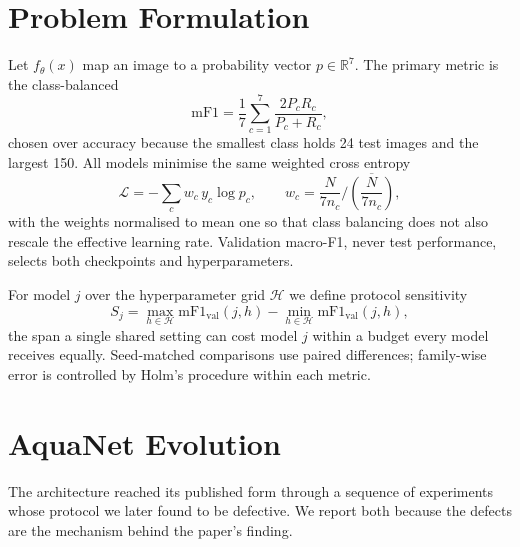 \documentclass[10pt,journal]{IEEEtran}
\newcommand{\mf}{macro-F1}
\begin{document}
\section{Problem Formulation}
Let $f_\theta(x)$ map an image to a probability vector $p \in \mathbb{R}^7$. The primary
metric is the class-balanced
\begin{equation}
\mathrm{mF1}=\frac{1}{7}\sum_{c=1}^{7}\frac{2P_cR_c}{P_c+R_c},
\end{equation}
chosen over accuracy because the smallest class holds 24 test images and the largest 150.
All models minimise the same weighted cross entropy
\begin{equation}
\mathcal{L}=-\sum_{c} w_c\, y_c \log p_c , \qquad
w_c = \frac{N}{7 n_c} \Big/ \overline{\left(\frac{N}{7 n_c}\right)},
\end{equation}
with the weights normalised to mean one so that class balancing does not also rescale the
effective learning rate. Validation \mf{}, never test performance, selects both checkpoints
and hyperparameters.

For model $j$ over the hyperparameter grid $\mathcal{H}$ we define protocol sensitivity
\begin{equation}\label{eq:sens}
S_j=\max_{h\in\mathcal{H}}\mathrm{mF1}_{\mathrm{val}}(j,h)-\min_{h\in\mathcal{H}}\mathrm{mF1}_{\mathrm{val}}(j,h),
\end{equation}
the span a single shared setting can cost model $j$ within a budget every model receives
equally. Seed-matched comparisons use paired differences; family-wise error is controlled by
Holm's procedure within each metric.

\section{AquaNet Evolution}\label{sec:evolution}
The architecture reached its published form through a sequence of experiments whose protocol
we later found to be defective. We report both because the defects are the mechanism behind
the paper's finding.
\end{document}
